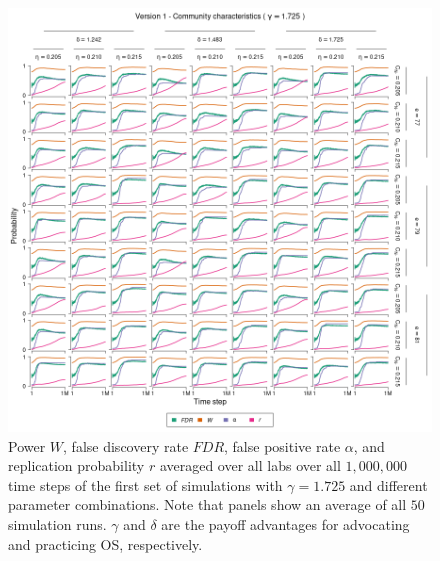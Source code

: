 \documentclass[meta, authordate]{jote-new-article}
\begin{document}
\begin{figure}
  \begin{fullwidth}
    \centering
    \includegraphics[width=\textwidth]{v1_cha_plot_sens_payypro1.725.png}
    \caption{Power $W$, false discovery rate $FDR$, false positive rate $\alpha$, and replication probability $r$ averaged over all labs over all $1,000,000$ time steps of the first set of simulations with $\gamma=1.725$ and different parameter combinations. Note that panels show an average of all $50$ simulation runs. $\gamma$ and $\delta$ are the payoff advantages for advocating and practicing OS, respectively.}
    \label{fig:v1_cha_plot_sens_payypro1.725}
  \end{fullwidth}
\end{figure}
%
%
\end{document}
